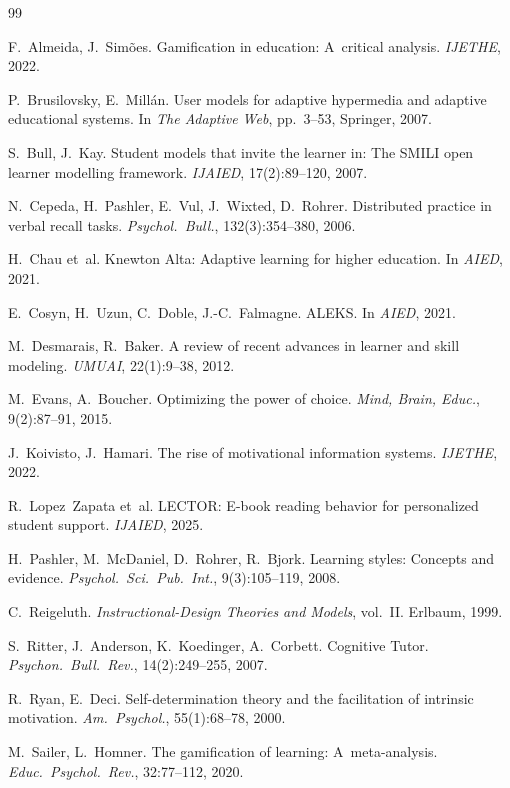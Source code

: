 \documentclass[sigconf]{acmart}
\begin{document}
\begin{thebibliography}{99}

F.~Almeida, J.~Sim\~{o}es. Gamification in education: A~critical analysis. {\em IJETHE}, 2022.

P.~Brusilovsky, E.~Mill\'{a}n. User models for adaptive hypermedia and adaptive educational systems. In {\em The Adaptive Web}, pp.~3--53, Springer, 2007.

S.~Bull, J.~Kay. Student models that invite the learner in: The {SMILI} open learner modelling framework. {\em IJAIED}, 17(2):89--120, 2007.

N.~Cepeda, H.~Pashler, E.~Vul, J.~Wixted, D.~Rohrer. Distributed practice in verbal recall tasks. {\em Psychol.\ Bull.}, 132(3):354--380, 2006.

H.~Chau et~al. Knewton Alta: Adaptive learning for higher education. In {\em AIED}, 2021.

E.~Cosyn, H.~Uzun, C.~Doble, J.-C.~Falmagne. {ALEKS}. In {\em AIED}, 2021.

M.~Desmarais, R.~Baker. A review of recent advances in learner and skill modeling. {\em UMUAI}, 22(1):9--38, 2012.

M.~Evans, A.~Boucher. Optimizing the power of choice. {\em Mind, Brain, Educ.}, 9(2):87--91, 2015.

J.~Koivisto, J.~Hamari. The rise of motivational information systems. {\em IJETHE}, 2022.

R.~Lopez~Zapata et~al. {LECTOR}: E-book reading behavior for personalized student support. {\em IJAIED}, 2025.

H.~Pashler, M.~McDaniel, D.~Rohrer, R.~Bjork. Learning styles: Concepts and evidence. {\em Psychol.\ Sci.\ Pub.\ Int.}, 9(3):105--119, 2008.

C.~Reigeluth. {\em Instructional-Design Theories and Models}, vol.~II. Erlbaum, 1999.

S.~Ritter, J.~Anderson, K.~Koedinger, A.~Corbett. Cognitive Tutor. {\em Psychon.\ Bull.\ Rev.}, 14(2):249--255, 2007.

R.~Ryan, E.~Deci. Self-determination theory and the facilitation of intrinsic motivation. {\em Am.\ Psychol.}, 55(1):68--78, 2000.

M.~Sailer, L.~Homner. The gamification of learning: A~meta-analysis. {\em Educ.\ Psychol.\ Rev.}, 32:77--112, 2020.


\end{thebibliography}
\end{document}
